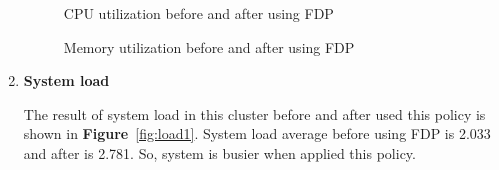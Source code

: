 \documentclass[12pt,oneside,openright,a4paper]{cpe-english-project}
\begin{document}
\begin{enumerate}
\begin{figure}[!h]\centering
    \setlength{\fboxrule}{0mm} %
    \setlength{\fboxsep}{0cm}
    \caption{CPU utilization before and after using FDP}\label{fig:cpu1}
\end{figure}

\begin{figure}[!h]\centering
    \setlength{\fboxrule}{0mm} %
    \setlength{\fboxsep}{0cm}
    \caption{Memory utilization before and after using FDP}\label{fig:mem1}
\end{figure}

  \item \textbf{System load}
  
\hspace{10mm}The result of system load in this cluster before and after used this policy is shown in \textbf{Figure}~\ref{fig:load1}. System load average before using FDP is 2.033 and after is 2.781. So, system is busier when applied this policy.
  

\end{enumerate}
\end{document}

